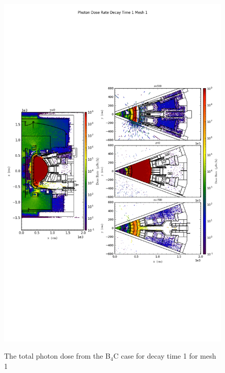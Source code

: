 \begin{figure}[ht!]
\centering
\includegraphics[trim={0cm 9cm 0cm 10cm},clip,scale=0.75]{../plots/final_model_with_b4c/Photon_Dose_Rate_Decay_Time_1_Mesh_1.png}
\label{fig:photons_dc1_no4bc_m1_flux}
\caption{The total photon dose from the B$_4$C case for decay time 1 for mesh 1}
\end{figure}

